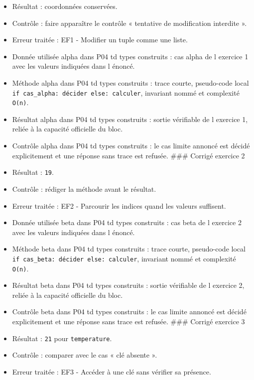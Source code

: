 \begin{itemize}
  Critère local : la réponse contient une donnée, une méthode, un
  résultat et une vérification. \#\# Corrigé \#\#\# Corrigé exercice 1
\item
  Résultat : coordonnées conservées.
\item
  Contrôle : faire apparaître le contrôle « tentative de modification
  interdite ».
\item
  Erreur traitée : EF1 - Modifier un tuple comme une liste.
\item
  Donnée utilisée alpha dans P04 td types construits : cas alpha de l
  exercice 1 avec les valeurs indiquées dans l énoncé.
\item
  Méthode alpha dans P04 td types construits : trace courte, pseudo-code
  local \texttt{if\ cas\_alpha:\ décider\ else:\ calculer}, invariant
  nommé et complexité \texttt{O(n)}.
\item
  Résultat alpha dans P04 td types construits : sortie vérifiable de l
  exercice 1, reliée à la capacité officielle du bloc.
\item
  Contrôle alpha dans P04 td types construits : le cas limite annoncé
  est décidé explicitement et une réponse sans trace est refusée. \#\#\#
  Corrigé exercice 2
\item
  Résultat : \texttt{19}.
\item
  Contrôle : rédiger la méthode avant le résultat.
\item
  Erreur traitée : EF2 - Parcourir les indices quand les valeurs
  suffisent.
\item
  Donnée utilisée beta dans P04 td types construits : cas beta de l
  exercice 2 avec les valeurs indiquées dans l énoncé.
\item
  Méthode beta dans P04 td types construits : trace courte, pseudo-code
  local \texttt{if\ cas\_beta:\ décider\ else:\ calculer}, invariant
  nommé et complexité \texttt{O(n)}.
\item
  Résultat beta dans P04 td types construits : sortie vérifiable de l
  exercice 2, reliée à la capacité officielle du bloc.
\item
  Contrôle beta dans P04 td types construits : le cas limite annoncé est
  décidé explicitement et une réponse sans trace est refusée. \#\#\#
  Corrigé exercice 3
\item
  Résultat : \texttt{21} pour \texttt{temperature}.
\item
  Contrôle : comparer avec le cas « clé absente ».
\item
  Erreur traitée : EF3 - Accéder à une clé sans vérifier sa présence.

\end{itemize}
